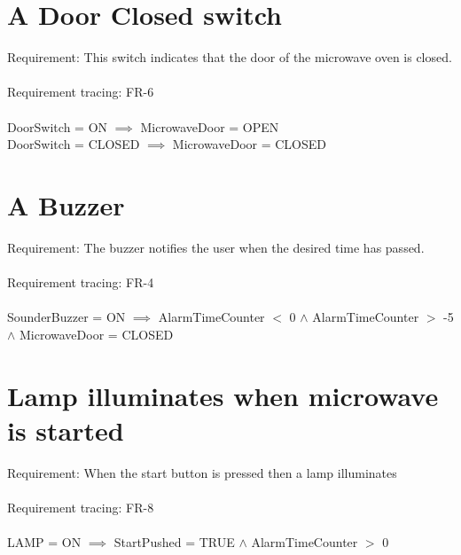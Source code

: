 \section{A Door Closed switch}
Requirement: This switch indicates that the door of the microwave oven is  closed.\\
\\
Requirement tracing: FR-6\\
\\
DoorSwitch = ON  $\implies$ MicrowaveDoor = OPEN  \\
DoorSwitch = CLOSED $\implies$ MicrowaveDoor = CLOSED \\


\section{A Buzzer}
Requirement: The buzzer notifies the user when the desired time has passed. \\
\\
 Requirement tracing: FR-4\\
\\
SounderBuzzer = ON $\implies$ AlarmTimeCounter $<$ 0 $\wedge$ AlarmTimeCounter $>$ -5 $\wedge$ MicrowaveDoor = CLOSED \\

\section{Lamp illuminates when microwave is started}
Requirement: When the start button is pressed then a lamp illuminates \\
\\
 Requirement tracing: FR-8\\
\\
LAMP = ON $\implies$ StartPushed = TRUE $\wedge$ AlarmTimeCounter $>$ 0 

